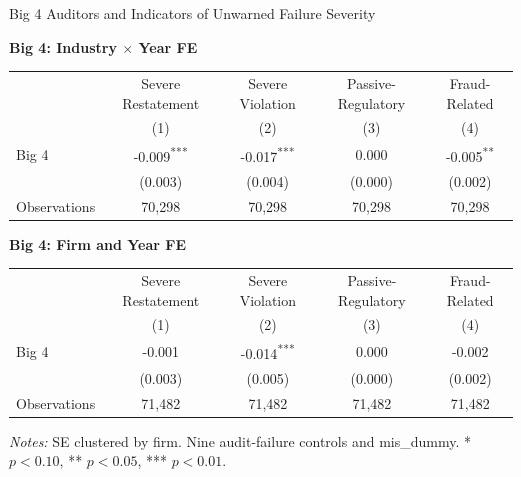 \documentclass[10pt]{article}
\newcommand{\sym}[1]{\textsuperscript{#1}}
\begin{document}
\fontsize{10}{12}\selectfont
\setlength{\tabcolsep}{3pt}\renewcommand{\arraystretch}{1.15}
\begin{center}\large Big 4 Auditors and Indicators of Unwarned Failure Severity\end{center}
\medskip\textbf{Big 4: Industry $\times$ Year FE}\par\smallskip
\begin{tabular*}{\textwidth}{@{\extracolsep{\fill}}lcccc@{}}
\toprule
 & Severe Restatement & Severe Violation & Passive-Regulatory & Fraud-Related \\
 & (1) & (2) & (3) & (4) \\
\midrule
Big 4 & -0.009\sym{***} & -0.017\sym{***} & 0.000 & -0.005\sym{**} \\
 & (0.003) & (0.004) & (0.000) & (0.002) \\
Observations & 70,298 & 70,298 & 70,298 & 70,298 \\
\bottomrule\end{tabular*}\par
\medskip\textbf{Big 4: Firm and Year FE}\par\smallskip
\begin{tabular*}{\textwidth}{@{\extracolsep{\fill}}lcccc@{}}
\toprule
 & Severe Restatement & Severe Violation & Passive-Regulatory & Fraud-Related \\
 & (1) & (2) & (3) & (4) \\
\midrule
Big 4 & -0.001 & -0.014\sym{***} & 0.000 & -0.002 \\
 & (0.003) & (0.005) & (0.000) & (0.002) \\
Observations & 71,482 & 71,482 & 71,482 & 71,482 \\
\bottomrule\end{tabular*}\par
\medskip\fontsize{9}{11}\selectfont\textit{Notes:} SE clustered by firm. Nine audit-failure controls and mis\_dummy. * $p<0.10$, ** $p<0.05$, *** $p<0.01$.
\end{document}
